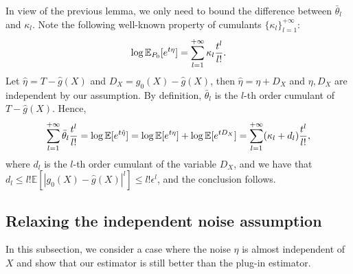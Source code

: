 \documentclass{article}
\def\eps{{\epsilon}}
\newcommand{\E}{\mathbb{E}}
\begin{document}
In view of the previous lemma, we only need to bound the difference between $\bar{\theta}_l$ and $\kappa_l$. Note the following well-known property of cumulants $\{\kappa_l\}_{l=1}^{+\infty}$: 
\begin{equation}
    \notag
    \log \E_{P_0}[e^{t\eta}] = \sum_{l=1}^{+\infty} \kappa_l\frac{t^l}{l!}.
\end{equation}
Let $\hat{\eta}=T-\hat{g}(X)$ and $D_X = g_0(X)-\hat{g}(X)$, then $\hat{\eta}=\eta+D_X$ and $\eta, D_X$ are independent by our assumption. By definition, $\bar{\theta}_l$ is the $l$-th order cumulant of $T-\hat{g}(X)$. Hence,
\begin{equation}
    \notag
    \sum_{l=1}^{+\infty} \bar{\theta}_l\frac{t^l}{l!} = \log\E[e^{t\hat{\eta}}] = \log\E[e^{t\eta}] + \log\E[ e^{tD_X}] = \sum_{l=1}^{+\infty} (\kappa_l+d_l)\frac{t^l}{l!},
\end{equation}
where $d_l$ is the $l$-th order cumulant of the variable $D_X$, and we have that $d_l \leq l!\E\left[ \left|g_0(X)-\hat{g}(X)\right|^l \right] \leq l!\eps^l$, and the conclusion follows.

\subsection{Relaxing the independent noise assumption}
\label{subsec:relax-independent-noise}

In this subsection, we consider a case where the noise $\eta$ is almost independent of $X$ and show that our estimator is still better than the plug-in estimator.
\end{document}
